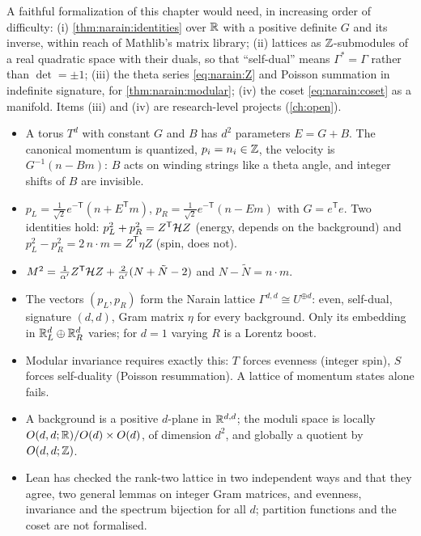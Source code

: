 A faithful formalization of this chapter would need, in increasing order of difficulty: (i)
\cref{thm:narain:identities} over $\mathbb{R}$ with a positive definite $G$ and its inverse, within
reach of Mathlib's matrix library; (ii) lattices as $\mathbb{Z}$-submodules of a real quadratic space
with their duals, so that ``self-dual'' means $\Gamma^*=\Gamma$ rather than $\det=\pm1$;
(iii) the theta series \eqref{eq:narain:Z} and Poisson summation in indefinite signature, for
\cref{thm:narain:modular}; (iv) the coset \eqref{eq:narain:coset} as a manifold. Items (iii)
and (iv) are research-level projects (\cref{ch:open}).

\begin{summarybox}
\begin{itemize}[leftmargin=*,itemsep=2pt]
\item A torus $T^d$ with constant $G$ and $B$ has $d^2$ parameters $E=G+B$. The canonical
 momentum is quantized, $p_i=n_i\in\mathbb{Z}$, the velocity is $G^{-1}(n-Bm)$: $B$ acts on winding
 strings like a theta angle, and integer shifts of $B$ are invisible.
\item $p_L=\frac1{\sqrt2}e^{-\mathsf T}(n+E^{\mathsf T}m)$, $p_R=\frac1{\sqrt2}e^{-\mathsf T}(n-Em)$ with
 $G=e^{\mathsf T}e$. Two identities hold: $p_L^2+p_R^2=Z^{\mathsf T}\mathcal{H} Z$ (energy, depends on the
 background) and $p_L^2-p_R^2=2\,n\cdot m=Z^{\mathsf T}\eta Z$ (spin, does not).
\item $M^2=\frac1{\alpha'} Z^{\mathsf T}\mathcal{H} Z+\frac2{\alpha'}(N+\tilde N-2)$ and $N-\tilde N=n\cdot m$.
\item The vectors $(p_L,p_R)$ form the Narain lattice $\Gamma^{d,d}\cong U^{\oplus d}$: even,
 self-dual, signature $(d,d)$, Gram matrix $\eta$ for every background. Only its embedding in
 $\mathbb{R}^d_L\oplus\mathbb{R}^d_R$ varies; for $d=1$ varying $R$ is a Lorentz boost.
\item Modular invariance requires exactly this: $T$ forces evenness (integer spin), $S$ forces
 self-duality (Poisson resummation). A lattice of momentum states alone fails.
\item A background is a positive $d$-plane in $\mathbb{R}^{d,d}$; the moduli space is locally
 $O(d,d;\mathbb{R})/O(d)\times O(d)$, of dimension $d^2$, and globally a quotient by $O(d,d;\mathbb{Z})$.
\item Lean has checked the rank-two lattice in two independent ways and that they agree,
 two general lemmas on integer Gram matrices, and evenness, invariance and the spectrum
 bijection for all $d$; partition functions and the coset are not formalised.
\end{itemize}
\end{summarybox}

